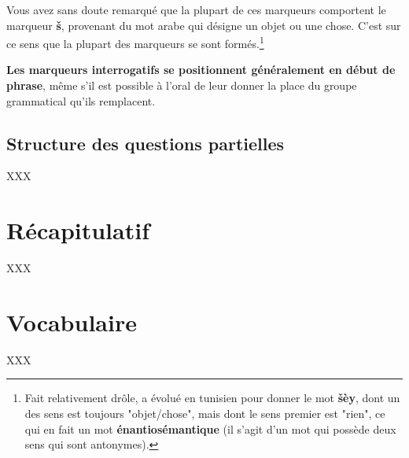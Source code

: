 Vous avez sans doute remarqué que la plupart de ces marqueurs comportent le marqueur \textbf{\v{s}}, provenant du mot arabe  qui désigne un objet ou une chose. C'est sur ce sens que la plupart des marqueurs se sont formés.\footnote{Fait relativement drôle,  a évolué en tunisien pour donner le mot \textbf{\v{s}èy}, dont un des sens est toujours "objet/chose", mais dont le sens premier est "rien", ce qui en fait un mot \textbf{énantiosémantique} (il s'agit d'un mot qui possède deux sens qui sont antonymes).}

\textbf{Les marqueurs interrogatifs se positionnent généralement en début de phrase}, même s'il est possible à l'oral de leur donner la place du groupe grammatical qu'ils remplacent.

\subsection{Structure des questions partielles}
XXX

\section{Récapitulatif}
XXX

\section*{Vocabulaire}
XXX
